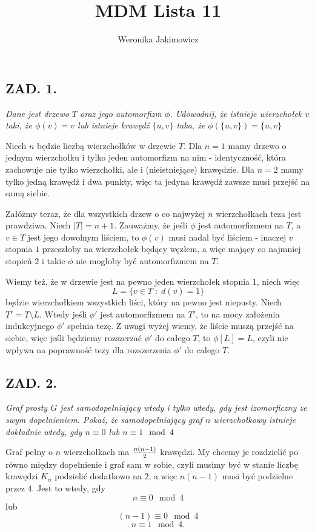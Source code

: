 \documentclass{article}
\author{Weronika Jakimowicz}
\title{MDM Lista 11}
\date{}
\begin{document}
\maketitle
\thispagestyle{empty}

\subsection*{ZAD. 1.}
\emph{Dane jest drzewo $T$ oraz jego automorfizm $\phi$. Udowodnij, że istnieje wierzchołek $v$ taki, że $\phi(v)=v$ lub istnieje krawędź $\{u,v\}$ taka, że $\phi(\{u,v\})=\{u,v\}$}
\medskip

\medskip

Niech $n$ będzie liczbą wierzchołków w drzewie $T$. Dla $n=1$ mamy drzewo o jednym wierzchołku i tylko jeden automorfizm na nim - identyczność, która zachowuje nie tylko wierzchołki, ale i (nieistniejące) krawędzie. Dla $n=2$ mamy tylko jedną krawędź i dwa punkty, więc ta jedyna krawędź zawsze musi przejść na samą siebie.
\smallskip

Załóżmy teraz, że dla wszystkich drzew o co najwyżej $n$ wierzchołkach teza jest prawdziwa. Niech $|T|=n+1$. Zauważmy, że jeśli $\phi$ jest automorfizmem na $T$, a $v\in T$ jest jego dowolnym liściem, to $\phi(v)$ musi nadal być liściem - inaczej $v$ stopnia $1$ przeszłoby na wierzchołek będący węzłem, a więc mający co najmniej stopień $2$ i takie $\phi$ nie mogłoby być automorfizmem na $T$.

Wiemy też, że w drzewie jest na pewno jeden wierzchołek stopnia $1$, niech więc 
$$L=\{v\in T\;:\;d(v)=1\}$$
będzie wierzchołkiem wszystkich liści, który na pewno jest niepusty. Niech $T'=T\setminus L$. Wtedy jeśli $\phi'$ jest automorfizmem na $T'$, to na mocy założenia indukcyjnego $\phi'$ spełnia tezę. Z uwagi wyżej wiemy, że liście muszą przejść na siebie, więc jeśli będziemy rozszerzać $\phi'$ do całego $T$, to $\phi[L]=L$, czyli nie wpływa na poprawność tezy dla rozszerzenia $\phi'$ do całego $T$.

\subsection*{ZAD. 2.}
\emph{Graf prosty $G$ jest samodopełniający wtedy i tylko wtedy, gdy jest izomorficzny ze swym dopełnieniem. Pokaż, że samodopełniający graf $n$ wierzchołkowy istnieje dokładnie wtedy, gdy $n\equiv0$ lub $n\equiv1\mod 4$}
\medskip

\medskip

Graf pełny o $n$ wierzchołkach ma ${n(n-1)\over 2}$ krawędzi. My chcemy je rozdzielić po równo między dopełnienie i graf sam w sobie, czyli musimy być w stanie liczbę krawędzi $K_n$ podzielić dodatkowo na $2$, a więc $n(n-1)$ musi być podzielne przez $4$. Jest to wtedy, gdy 
$$n\equiv0\mod4$$
lub 
$$(n-1)\equiv0\mod4$$
$$n\equiv1\mod4.$$
\end{document}
